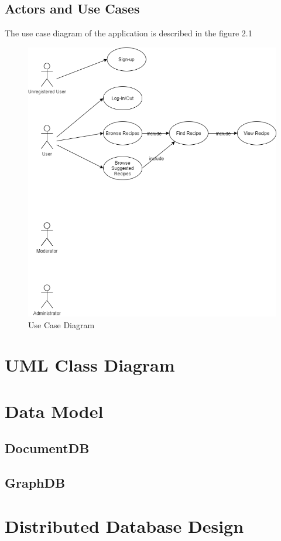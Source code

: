 \documentclass[a4paper]{report}
\begin{document}
\subsection{Actors and Use Cases}
The use case diagram of the application is described in the figure 2.1 
\begin{figure}[htpb]
	\centering
	\includegraphics[scale=0.5]{img/UseCaseDiagram.png}
	\caption{Use Case Diagram}
\end{figure}
\section{UML Class Diagram}
\section{Data Model}
\subsection{DocumentDB}
\subsection{GraphDB}
\section{Distributed Database Design}
\end{document}
